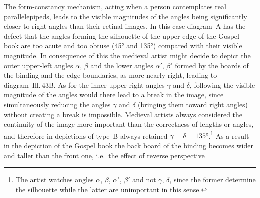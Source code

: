 The form-constancy mechanism, acting when a person contemplates real parallelepipeds,
leads to the visible magnitudes of the angles being significantly closer to right
angles than their retinal images.  In this case diagram~A has the defect that the
angles forming the silhouette of the upper edge of the Gospel book are too acute and
too obtuse (45° and 135°) compared with their visible magnitude.  In consequence of
this the medieval artist might decide to depict the outer upper-left angles $\alpha$,
$\beta$ and the lower angles $\alpha'$, $\beta'$ formed by the boards of the binding
and the edge boundaries, as more nearly right, leading to diagram~Ill.\,43B.  As for
the inner upper-right angles $\gamma$ and $\delta$, following the visible magnitude
of the angles would there lead to a break in the image, since simultaneously reducing
the angles $\gamma$ and $\delta$ (bringing them toward right angles) without creating
a break is impossible.  Medieval artists always considered the continuity of the image
more important than the correctness of lengths or angles, and therefore in depictions
of type~B always retained $\gamma = \delta = 135°$.\footnote{The artist watches
  angles $\alpha$, $\beta$, $\alpha'$, $\beta'$ and not $\gamma$, $\delta$, since the
  former determine the silhouette while the latter are unimportant in this sense.}
As a result in the depiction of the Gospel book the back board of the binding becomes
wider and taller than the front one, i.e.\ the effect of reverse perspective
